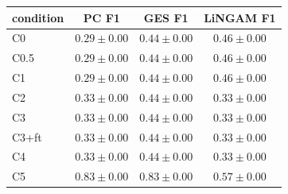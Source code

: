 \begin{tabular}{l|ccc}
\hline
condition & PC F1 & GES F1 & LiNGAM F1 \\
\hline
C0 & $0.29 \pm 0.00$ & $0.44 \pm 0.00$ & $0.46 \pm 0.00$ \\
C0.5 & $0.29 \pm 0.00$ & $0.44 \pm 0.00$ & $0.46 \pm 0.00$ \\
C1 & $0.29 \pm 0.00$ & $0.44 \pm 0.00$ & $0.46 \pm 0.00$ \\
C2 & $0.33 \pm 0.00$ & $0.44 \pm 0.00$ & $0.33 \pm 0.00$ \\
C3 & $0.33 \pm 0.00$ & $0.44 \pm 0.00$ & $0.33 \pm 0.00$ \\
C3+ft & $0.33 \pm 0.00$ & $0.44 \pm 0.00$ & $0.33 \pm 0.00$ \\
C4 & $0.33 \pm 0.00$ & $0.44 \pm 0.00$ & $0.33 \pm 0.00$ \\
C5 & $0.83 \pm 0.00$ & $0.83 \pm 0.00$ & $0.57 \pm 0.00$ \\
\hline
\end{tabular}
